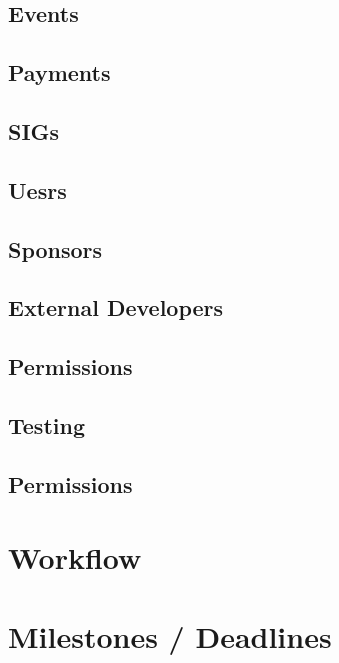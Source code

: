 \documentclass{article}
\begin{document}
\subsection{Events}
\subsection{Payments}
\subsection{SIGs}
\subsection{Uesrs}
\subsection{Sponsors}
\subsection{External Developers}
\subsection{Permissions}
\subsection{Testing}
\subsection{Permissions}

\section{Workflow}

\section{Milestones / Deadlines}
\end{document}
